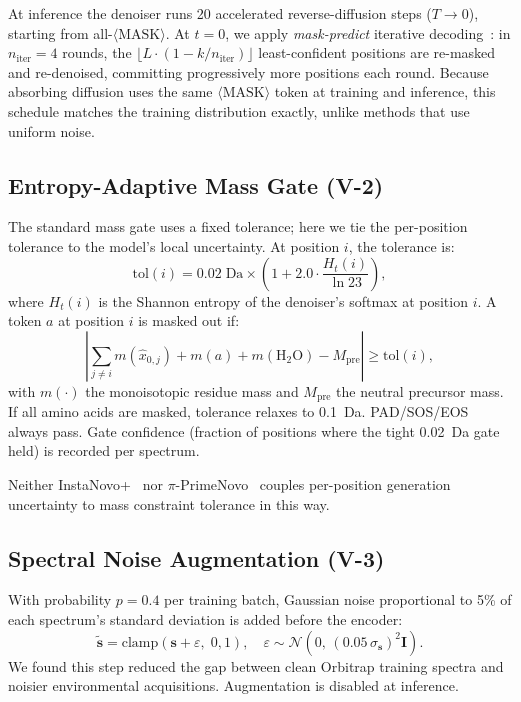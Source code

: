 \documentclass[11pt]{article}
\begin{document}
At inference the denoiser runs 20 accelerated reverse-diffusion steps ($T\to0$),
starting from all-$\langle\text{MASK}\rangle$. At $t=0$, we apply
\emph{mask-predict} iterative decoding~\cite{d3pm}: in $n_\text{iter}=4$ rounds,
the $\lfloor L\cdot(1 - k/n_\text{iter})\rfloor$ least-confident positions are
re-masked and re-denoised, committing progressively more positions each round.
Because absorbing diffusion uses the same $\langle\text{MASK}\rangle$ token at
training and inference, this schedule matches the training distribution exactly,
unlike methods that use uniform noise.

\subsection{Entropy-Adaptive Mass Gate (V-2)}

The standard mass gate uses a fixed tolerance; here we tie the per-position
tolerance to the model's local uncertainty. At position $i$, the tolerance is:
\begin{equation}
  \text{tol}(i) = 0.02\;\text{Da} \times
  \left(1 + 2.0 \cdot \frac{H_t(i)}{\ln 23}\right),
\end{equation}
where $H_t(i)$ is the Shannon entropy of the denoiser's softmax at position $i$.
A token $a$ at position $i$ is masked out if:
\begin{equation}
  \left|\sum_{j \neq i} m(\hat{x}_{0,j}) + m(a) + m(\mathrm{H_2O})
  - M_\text{pre}\right| \geq \text{tol}(i),
\end{equation}
with $m(\cdot)$ the monoisotopic residue mass and $M_\text{pre}$ the neutral
precursor mass. If all amino acids are masked, tolerance relaxes to 0.1~Da.
PAD/SOS/EOS always pass. Gate confidence (fraction of positions where the
tight 0.02~Da gate held) is recorded per spectrum.

Neither InstaNovo+~\cite{instanovo} nor $\pi$-PrimeNovo~\cite{primenovo} couples
per-position generation uncertainty to mass constraint tolerance in this way.

\subsection{Spectral Noise Augmentation (V-3)}

With probability $p=0.4$ per training batch, Gaussian noise proportional to
5\% of each spectrum's standard deviation is added before the encoder:
\begin{equation}
  \tilde{\mathbf{s}} = \mathrm{clamp}\!\left(
  \mathbf{s} + \varepsilon,\; 0, 1\right),
  \quad \varepsilon \sim \mathcal{N}(0,\,(0.05\,\sigma_\mathbf{s})^2\mathbf{I}).
\end{equation}
We found this step reduced the gap between clean Orbitrap training spectra and noisier
environmental acquisitions. Augmentation is disabled at inference.
\end{document}
